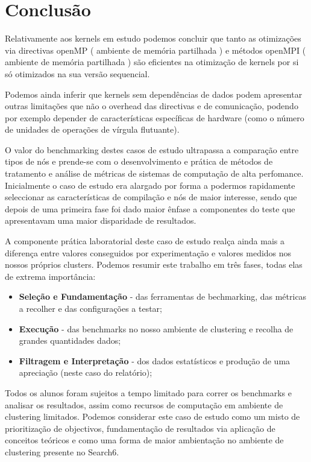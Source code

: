\documentclass[conference,compsoc]{IEEEtran}
\begin{document}
\section{Conclusão}
Relativamente aos kernels em estudo podemos concluir que tanto as otimizações via directivas openMP ( ambiente de memória partilhada ) e métodos openMPI ( ambiente de memória partilhada ) são eficientes na otimização de kernels por si só otimizados na sua versão sequencial.\par Podemos ainda inferir que kernels sem dependências de dados podem apresentar outras limitações que não o overhead das directivas e de comunicação, podendo por exemplo depender de características específicas de hardware (como o número de unidades de operações de vírgula flutuante). \par 
O valor do benchmarking destes casos de estudo ultrapassa a comparação entre tipos de nós e prende-se com o desenvolvimento e prática de métodos de tratamento e análise de métricas de sistemas de computação de alta perfomance.  Inicialmente o caso de estudo era alargado por forma a podermos rapidamente seleccionar as características de compilação e nós de maior interesse, sendo que depois de uma primeira fase foi dado maior ênfase a componentes do teste que apresentavam uma maior disparidade de resultados. \par 
A componente prática laboratorial deste caso de estudo realça ainda mais a diferença entre valores conseguidos por experimentação e valores medidos nos nossos próprios clusters. Podemos resumir este trabalho em três fases, todas elas de extrema importância: 
\begin{itemize}
\item \textbf{Seleção e Fundamentação} - das ferramentas de bechmarking, das métricas a recolher e das configurações a testar;
\item \textbf{Execução} - das benchmarks no nosso ambiente de clustering e recolha de grandes quantidades dados;
\item \textbf{Filtragem e Interpretação} - dos dados estatísticos e produção de uma apreciação (neste caso do relatório);
\end{itemize}
Todos os alunos foram sujeitos a tempo limitado para correr os benchmarks e analisar os resultados, assim como recursos de computação em ambiente de clustering limitados. Podemos considerar este caso de estudo como um misto de prioritização de objectivos, fundamentação de resultados via aplicação de conceitos teóricos e como uma forma de maior ambientação no ambiente de clustering presente no Search6.
\end{document}
